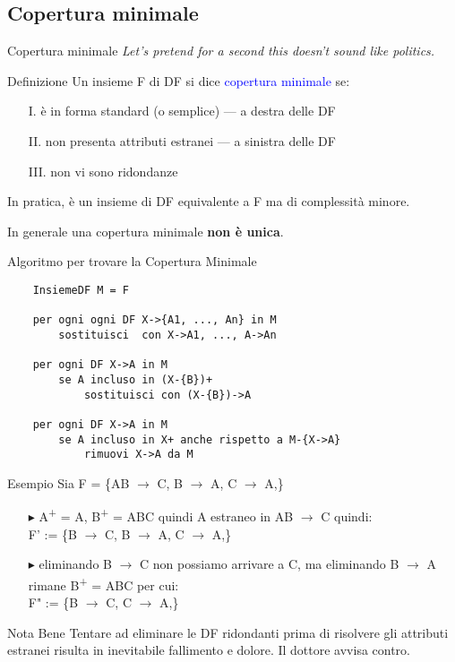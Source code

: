\documentclass{beamer}
\begin{document}
\subsection{Copertura minimale}
\begin{frame}{Copertura minimale}
    \textit{Let's pretend for a second this doesn't sound like politics.}
    \begin{block}{Definizione}
    Un insieme F di DF si dice \textcolor{blue}{copertura minimale} se:
    \begin{enumerate}
        \item[I.] è in forma standard (o semplice) --- a destra delle DF
        \item[II.] non presenta attributi estranei --- a sinistra delle DF
        \item[III.] non vi sono ridondanze
    \end{enumerate}
    In pratica, è un insieme di DF equivalente a F ma di complessità minore.
    \end{block}
    \vfill
    In generale una copertura minimale \textbf{non è unica}.
\end{frame}

\begin{frame}[fragile]{Algoritmo per trovare la Copertura Minimale}
    \begin{verbatim}
    InsiemeDF M = F
    
    per ogni ogni DF X->{A1, ..., An} in M
        sostituisci  con X->A1, ..., A->An
        
    per ogni DF X->A in M
        se A incluso in (X-{B})+
            sostituisci con (X-{B})->A
        
    per ogni DF X->A in M
        se A incluso in X+ anche rispetto a M-{X->A}
            rimuovi X->A da M
    \end{verbatim}
\end{frame}

\begin{frame}{Esempio}
Sia F = \{AB $\rightarrow$ C, B $\rightarrow$ A, C $\rightarrow$ A,\}\par
\begin{itemize}
    \item[$\blacktriangleright$] A\textsuperscript{+} = A, B\textsuperscript{+} = ABC quindi A estraneo in AB $\rightarrow$ C quindi:\\
    F' := \{B $\rightarrow$ C, B $\rightarrow$ A, C $\rightarrow$ A,\}
    \item[$\blacktriangleright$] eliminando B $\rightarrow$ C non possiamo arrivare a C, ma eliminando B $\rightarrow$ A rimane B\textsuperscript{+} = ABC per cui:\\
    F" := \{B $\rightarrow$ C, C $\rightarrow$ A,\}
\end{itemize}

\begin{alertblock}{Nota Bene}
    Tentare ad eliminare le DF ridondanti prima di risolvere gli attributi estranei risulta in inevitabile fallimento e dolore. Il dottore avvisa contro.
\end{alertblock}
\end{frame}
\end{document}
